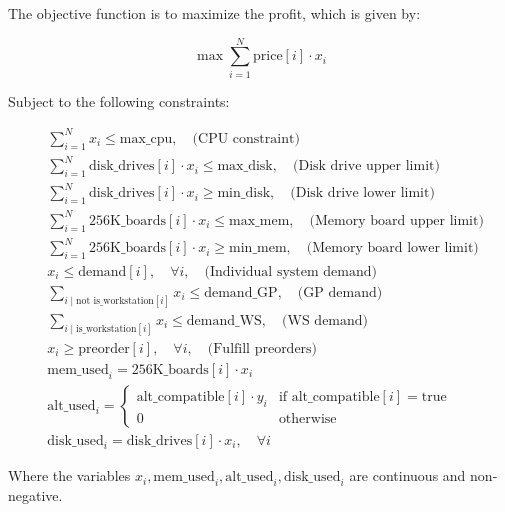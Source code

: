 \documentclass{article}
\begin{document}
The objective function is to maximize the profit, which is given by:

\[
\max \sum_{i=1}^{N} \text{price}[i] \cdot x_i
\]

Subject to the following constraints:

\begin{align*}
    & \sum_{i=1}^{N} x_i \leq \text{max\_cpu}, \quad \text{(CPU constraint)}\\
    & \sum_{i=1}^{N} \text{disk\_drives}[i] \cdot x_i \leq \text{max\_disk}, \quad \text{(Disk drive upper limit)} \\
    & \sum_{i=1}^{N} \text{disk\_drives}[i] \cdot x_i \geq \text{min\_disk}, \quad \text{(Disk drive lower limit)}\\
    & \sum_{i=1}^{N} \text{256K\_boards}[i] \cdot x_i \leq \text{max\_mem}, \quad \text{(Memory board upper limit)} \\
    & \sum_{i=1}^{N} \text{256K\_boards}[i] \cdot x_i \geq \text{min\_mem}, \quad \text{(Memory board lower limit)}\\
    & x_i \leq \text{demand}[i], \quad \forall i, \quad \text{(Individual system demand)} \\
    & \sum_{i \mid \text{not is\_workstation}[i]} x_i \leq \text{demand\_GP}, \quad \text{(GP demand)} \\
    & \sum_{i \mid \text{is\_workstation}[i]} x_i \leq \text{demand\_WS}, \quad \text{(WS demand)} \\
    & x_i \geq \text{preorder}[i], \quad \forall i, \quad \text{(Fulfill preorders)} \\
    & \text{mem\_used}_i = \text{256K\_boards}[i] \cdot x_i \\
    & \text{alt\_used}_i = \begin{cases} 
        \text{alt\_compatible}[i] \cdot y_i & \text{if } \text{alt\_compatible}[i] = \text{true} \\ 
        0 & \text{otherwise} 
    \end{cases} \\
    & \text{disk\_used}_i = \text{disk\_drives}[i] \cdot x_i, \quad \forall i
\end{align*}

Where the variables \( x_i, \text{mem\_used}_i, \text{alt\_used}_i, \text{disk\_used}_i \) are continuous and non-negative.
\end{document}
